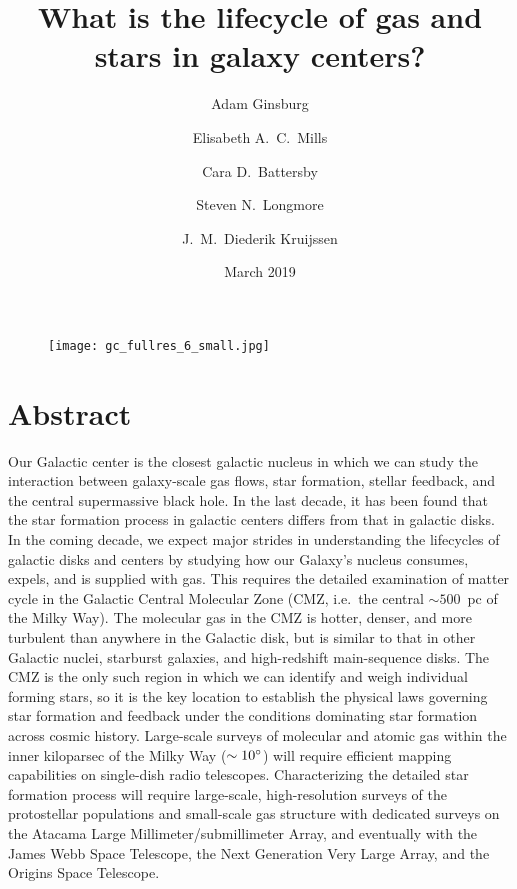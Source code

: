 \documentclass[modern]{aastex62}
\begin{document}
\author{Adam Ginsburg}
\author{Elisabeth A.~C.~Mills}
\author{Cara D.~Battersby}
\author{Steven N.~Longmore}
\author{J.~M.~Diederik Kruijssen}

\title{What is the lifecycle of gas and stars in galaxy centers?}
\date{March 2019}

\section*{}

\begin{figure}[htp]
    \texttt{[image: gc\_fullres\_6\_small.jpg]}
\end{figure}

\clearpage



\section*{Abstract}
Our Galactic center is the closest galactic nucleus in which we can study the interaction between galaxy-scale gas flows, star formation, stellar feedback, and the central supermassive black hole. In the last decade, it has been found that the star formation process in galactic centers differs from that in galactic disks. In the coming decade, we expect major strides in understanding the lifecycles of galactic disks and centers by studying how our Galaxy's nucleus consumes, expels, and is supplied with gas. This requires the detailed examination of matter cycle in the Galactic Central Molecular Zone (CMZ, i.e.~the central $\sim500$~pc of the Milky Way). The molecular gas in the CMZ is hotter, denser, and more turbulent than anywhere in the Galactic disk, but is similar to that in other Galactic nuclei, starburst galaxies, and high-redshift main-sequence disks. The CMZ is the only such region in which we can identify and weigh individual forming stars, so it is the key location to establish the physical laws governing star formation and feedback under the conditions dominating star formation across cosmic history. Large-scale surveys of molecular and atomic gas within the inner kiloparsec of the Milky Way ($\sim10^{\circ}$) will require efficient mapping capabilities on single-dish radio telescopes. Characterizing the detailed star formation process will require large-scale, high-resolution surveys of the protostellar populations and small-scale gas structure with dedicated surveys on the Atacama Large Millimeter/submillimeter Array, and eventually with the James Webb Space Telescope, the Next Generation Very Large Array, and the Origins Space Telescope.
\vspace{5mm}
\end{document}
